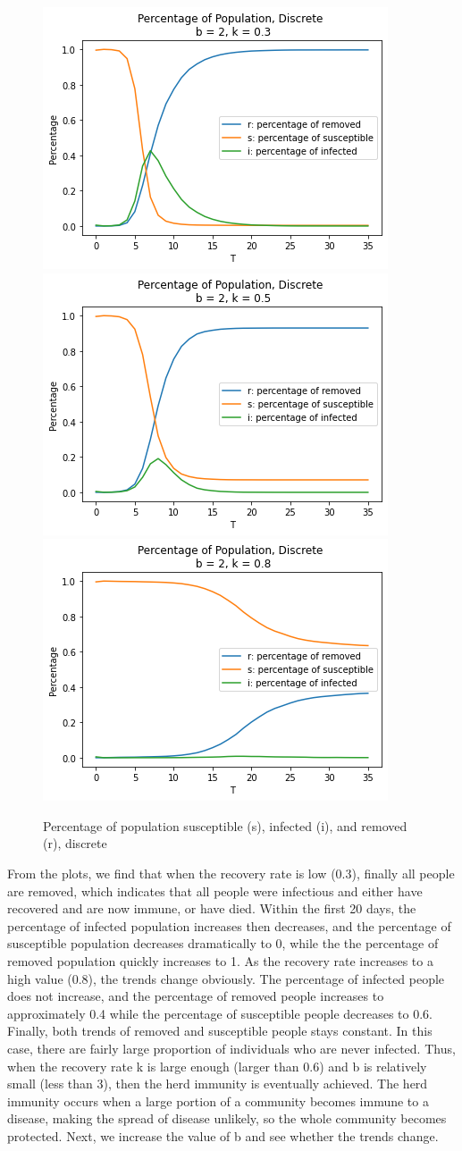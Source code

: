 \documentclass{article}
\begin{document}
\begin{figure}[htp]

\centering
\includegraphics[width=.3\textwidth]{Figure1_discrete_sir_b2_k1.png}\hfill
\includegraphics[width=.3\textwidth]{Figure1_discrete_sir_b2_k2.png}\hfill
\includegraphics[width=.3\textwidth]{Figure1_discrete_sir_b2_k3.png}

\caption{Percentage of population susceptible (s), infected (i), and removed (r), discrete}
\label{fig:figure3}

\end{figure}



From the plots, we find that when the recovery rate is low (0.3), finally all people are removed, which indicates that all people were infectious and either have recovered and are now immune, or have died. Within the first 20 days, the percentage of infected population increases then decreases, and the percentage of susceptible population decreases dramatically to 0, while the the percentage of removed population quickly increases to 1. As the recovery rate increases to a high value (0.8), the trends change obviously. The percentage of infected people does not increase, and the percentage of removed people increases to approximately 0.4 while the percentage of susceptible people decreases to 0.6. Finally, both trends of removed and susceptible people stays constant. In this case, there are fairly large proportion of individuals who are never infected. Thus, when the recovery rate k is large enough (larger than 0.6) and b is relatively small (less than 3), then the herd immunity is eventually achieved. The herd immunity occurs when a large portion of a community becomes immune to a disease, making the spread of disease unlikely, so the whole community becomes protected. Next, we increase the value of b and see whether the trends change.
\end{document}
